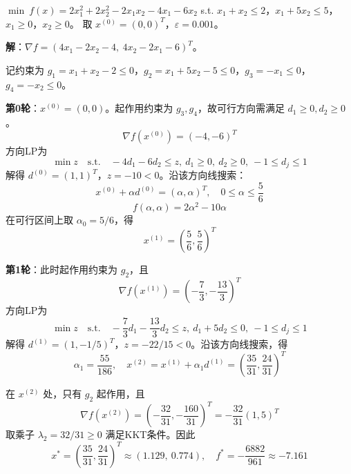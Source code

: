 \begin{example}\label{ex:fd}
$\min\ f(x) = 2x_1^2 + 2x_2^2 - 2x_1 x_2 - 4x_1 - 6x_2$
s.t. $x_1 + x_2 \leq 2$，$x_1 + 5x_2 \leq 5$，$x_1 \geq 0$，$x_2 \geq 0$。
取 $x^{(0)} = (0, 0)^T$，$\varepsilon = 0.001$。

\textbf{解}：$\nabla f = (4x_1 - 2x_2 - 4,\ 4x_2 - 2x_1 - 6)^T$。

记约束为 $g_1=x_1+x_2-2\leq0$，$g_2=x_1+5x_2-5\leq0$，$g_3=-x_1\leq0$，$g_4=-x_2\leq0$。

\textbf{第0轮}：$x^{(0)} = (0, 0)$。起作用约束为 $g_3,g_4$，故可行方向需满足 $d_1\geq0,d_2\geq0$。
\[
\nabla f(x^{(0)})=(-4,-6)^T
\]
方向LP为
\[
\min z\quad \text{s.t.}\quad -4d_1-6d_2\leq z,\ d_1\geq0,\ d_2\geq0,\ -1\leq d_j\leq1
\]
解得 $d^{(0)}=(1,1)^T$，$z=-10<0$。沿该方向线搜索：
\[
x^{(0)}+\alpha d^{(0)}=(\alpha,\alpha)^T,\quad
0\leq \alpha\leq \frac{5}{6}
\]
\[
f(\alpha,\alpha)=2\alpha^2-10\alpha
\]
在可行区间上取 $\alpha_0=5/6$，得
\[
x^{(1)}=\left(\frac{5}{6},\frac{5}{6}\right)^T
\]

\textbf{第1轮}：此时起作用约束为 $g_2$，且
\[
\nabla f(x^{(1)})=\left(-\frac{7}{3},-\frac{13}{3}\right)^T
\]
方向LP为
\[
\min z\quad \text{s.t.}\quad -\frac{7}{3}d_1-\frac{13}{3}d_2\leq z,\ d_1+5d_2\leq0,\ -1\leq d_j\leq1
\]
解得 $d^{(1)}=(1,-1/5)^T$，$z=-22/15<0$。沿该方向线搜索，得
\[
\alpha_1=\frac{55}{186},\quad
x^{(2)}=x^{(1)}+\alpha_1 d^{(1)}
=\left(\frac{35}{31},\frac{24}{31}\right)^T
\]

在 $x^{(2)}$ 处，只有 $g_2$ 起作用，且
\[
\nabla f(x^{(2)})=\left(-\frac{32}{31},-\frac{160}{31}\right)^T
=-\frac{32}{31}(1,5)^T
\]
取乘子 $\lambda_2=32/31\geq0$ 满足KKT条件。因此
\[
x^*=\left(\frac{35}{31},\frac{24}{31}\right)^T\approx(1.129,\ 0.774),\quad
f^*=-\frac{6882}{961}\approx -7.161
\]
\end{example}

